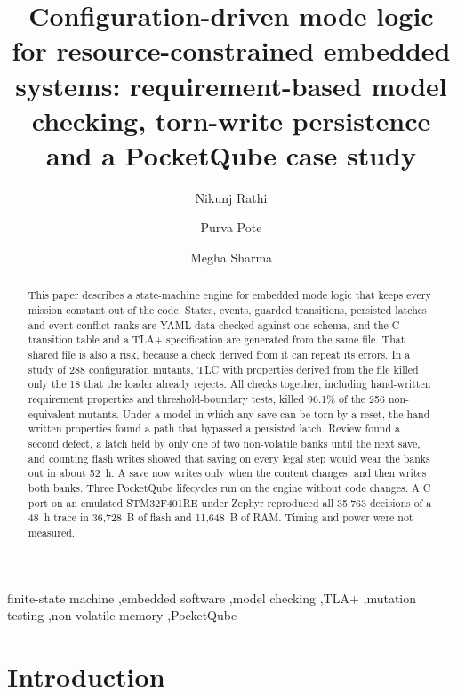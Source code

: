 \documentclass[preprint,12pt]{elsarticle}
\begin{document}
\begin{frontmatter}

\title{Configuration-driven mode logic for resource-constrained embedded systems: requirement-based model checking, torn-write persistence and a PocketQube case study}
\author{Nikunj Rathi}
\author{Purva Pote}
\author{Megha Sharma}
\begin{abstract}
This paper describes a state-machine engine for embedded mode logic that keeps every mission constant out of the code. States, events, guarded transitions, persisted latches and event-conflict ranks are YAML data checked against one schema, and the C transition table and a TLA+ specification are generated from the same file. That shared file is also a risk, because a check derived from it can repeat its errors. In a study of 288 configuration mutants, TLC with properties derived from the file killed only the 18 that the loader already rejects. All checks together, including hand-written requirement properties and threshold-boundary tests, killed 96.1\% of the 256 non-equivalent mutants. Under a model in which any save can be torn by a reset, the hand-written properties found a path that bypassed a persisted latch. Review found a second defect, a latch held by only one of two non-volatile banks until the next save, and counting flash writes showed that saving on every legal step would wear the banks out in about 52~h. A save now writes only when the content changes, and then writes both banks. Three PocketQube lifecycles run on the engine without code changes. A C port on an emulated STM32F401RE under Zephyr reproduced all 35,763 decisions of a 48~h trace in 36,728~B of flash and 11,648~B of RAM. Timing and power were not measured.
\end{abstract}

\begin{keyword}
finite-state machine \sep embedded software \sep model checking \sep TLA+ \sep mutation testing \sep non-volatile memory \sep PocketQube
\end{keyword}

\end{frontmatter}

\section{Introduction}\label{sec:intro}
\end{document}
